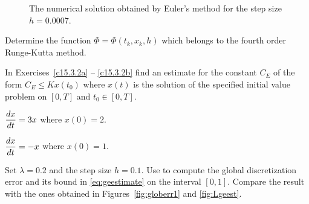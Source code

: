 \documentclass{ximera}
\begin{document}
\begin{figure}[htb]
   \centerline{%
   }
   \caption{The numerical solution obtained by Euler's method for the 
   step size $h=0.0007$.}
   \label{fig:hsmall}
\end{figure}

\EXER

\TEXER

\begin{exercise} \label{c15.3.1}
Determine the function $\Phi=\Phi(t_k,x_k,h)$ which belongs to the 
fourth order Runge-Kutta method.
\end{exercise}

\noindent In Exercises~\ref{c15.3.2a} -- \ref{c15.3.2b} find an estimate
for the constant $C_E$ of the form $C_E \le Kx(t_0)$ where $x(t)$ is the
solution of the specified initial value problem on $[0,T]$ and $t_0\in[0,T]$.
\begin{exercise} \label{c15.3.2a}
$\displaystyle\frac{dx}{dt} = 3 x$ where $x(0) = 2$.
\end{exercise}
\begin{exercise} \label{c15.3.2b}
$\displaystyle\frac{dx}{dt} = -x$ where $x(0) = 1$.
\end{exercise}


\CEXER

\begin{exercise} \label{c15.3.3}
Set $\lambda=0.2$ and the step size $h=0.1$.  Use \Matlab to compute 
the global discretization error and its bound in \eqref{eq:geestimate}
on the interval $[0,1]$.  Compare the result with the ones obtained 
in Figures~\ref{fig:globerr1} and \ref{fig:Lgeest}.
\end{exercise}
\end{document}
